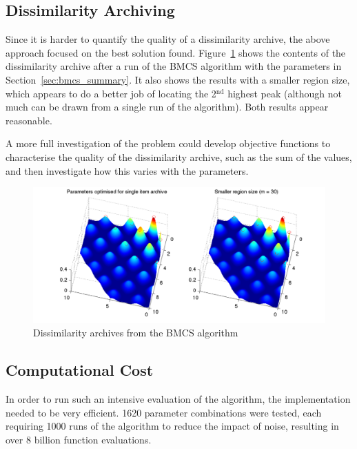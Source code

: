 \documentclass[10pt]{article}
\begin{document}
\subsection{Dissimilarity Archiving}
\label{sec:bmcs_dissim}

Since it is harder to quantify the quality of a dissimilarity archive, the
above approach focused on the best solution found.
Figure~\ref{fig:bmcs_dissim} shows the contents of the dissimilarity archive
after a run of the BMCS algorithm with the parameters in
Section~\ref{sec:bmcs_summary}. It also shows the results with a smaller
region size, which appears to do a better job of locating the
2$^\textrm{nd}$ highest peak (although not much can be drawn from a single
run of the algorithm). Both results appear reasonable.

A more full investigation of the problem could develop objective
functions to characterise the quality of the dissimilarity archive, such as
the sum of the values, and then investigate how this varies with the
parameters.

\begin{figure}
  \begin{center}
    \includegraphics[width=16cm]{bmcs_dissim.pdf}
    \end{center}
    \caption{Dissimilarity archives from the BMCS algorithm}
    \label{fig:bmcs_dissim}
    \end{figure}

\subsection{Computational Cost}

In order to run such an intensive evaluation of the algorithm, the
implementation needed to be very efficient. 1620 parameter combinations were
tested, each requiring 1000 runs of the algorithm to reduce the impact of
noise, resulting in over 8 billion function evaluations.
\end{document}
